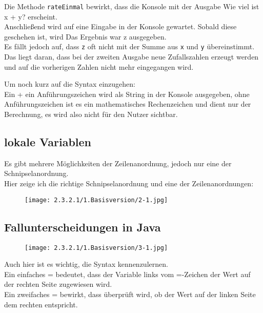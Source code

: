 \documentclass{scrartcl}   %
\begin{document}
Die Methode \texttt{rateEinmal} bewirkt, dass die Konsole mit der Ausgabe \glqq Wie viel ist x + y?\grqq{} erscheint.\\
Anschließend wird auf eine Eingabe in der Konsole gewartet. Sobald diese geschehen ist, wird \glqq Das Ergebnis war z\grqq{} ausgegeben.\\
Es fällt jedoch auf, dass \texttt{z} oft nicht mit der Summe aus \texttt{x} und \texttt{y} übereinstimmt. Das liegt daran, dass bei der zweiten Ausgabe neue Zufallszahlen erzeugt werden und auf die vorherigen Zahlen nicht mehr eingegangen wird.

Um noch kurz auf die Syntax einzugehen:\\
Ein \glqq +\grqq{} ein Anführungszeichen wird als String in der Konsole ausgegeben, ohne Anführungszeichen ist es ein mathematisches Rechenzeichen und dient nur der Berechnung, es wird also nicht für den Nutzer sichtbar.

\subsection{lokale Variablen}

Es gibt mehrere Möglichkeiten der Zeilenanordnung, jedoch nur eine der Schnipselanordnung.\\
Hier zeige ich die richtige Schnipselanordnung und eine der Zeilenanordnungen:\\

\begin{figure}[ht]
	\centering
	\texttt{[image: 2.3.2.1/1.Basisversion/2-1.jpg]}
\end{figure}

\newpage

\subsection{Fallunterscheidungen in Java}

\begin{figure}[ht]
	\centering
	\texttt{[image: 2.3.2.1/1.Basisversion/3-1.jpg]}
\end{figure}

Auch hier ist es wichtig, die Syntax kennenzulernen.\\
Ein einfaches \glqq =\grqq{} bedeutet, dass der Variable links vom \glqq =\grqq{}-Zeichen der Wert auf der rechten Seite zugewiesen wird.\\
Ein zweifaches \glqq =\grqq{} bewirkt, dass überprüft wird, ob der Wert auf der linken Seite dem rechten entspricht.
\end{document}
